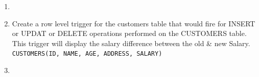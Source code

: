 \documentclass{article}
\newcommand{\answer}{\item[$\rightarrow$]}
\begin{document}
\begin{enumerate}[label=\arabic*. ]
\begin{enumerate}[label=\alph*) ]
			\item Find the Maximum age from employee table.
			\item Find the Minimum age from employeetable.
			\item Find salaries of employee in Ascending Order.
			\item Find grouped salaries of employees.
		\end{enumerate}
		\answer \inputminted{mysql}{../Lab3.sql} \newpage
		\item Create a row level trigger for the customers table that would fire for INSERT or UPDAT or
			DELETE operations performed on the CUSTOMERS table. This trigger will display the salary
		difference between the old \& new Salary. \texttt{CUSTOMERS(ID, NAME, AGE, ADDRESS, SALARY)}
		\answer \inputminted{mysql}{../Lab4.sql}
	\end{enumerate}
\end{document}
